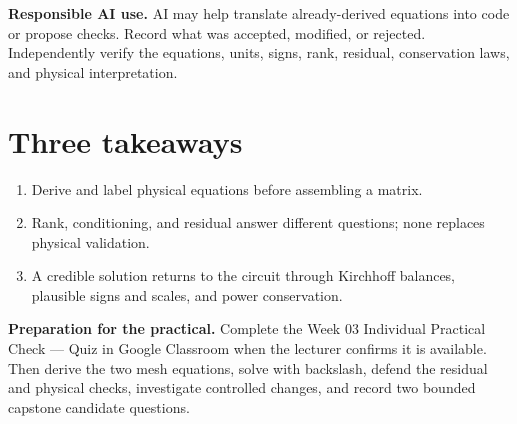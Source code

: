 \documentclass[11pt,a4paper]{article}
\begin{document}
\begin{aibox}
\textbf{Responsible AI use.} AI may help translate already-derived equations into code or propose checks. Record what was accepted, modified, or rejected. Independently verify the equations, units, signs, rank, residual, conservation laws, and physical interpretation.
\end{aibox}

\section*{Three takeaways}
\begin{enumerate}[nosep,leftmargin=6mm]
  \item Derive and label physical equations before assembling a matrix.
  \item Rank, conditioning, and residual answer different questions; none replaces physical validation.
  \item A credible solution returns to the circuit through Kirchhoff balances, plausible signs and scales, and power conservation.
\end{enumerate}

\begin{keybox}
\textbf{Preparation for the practical.} Complete the Week 03 Individual Practical Check --- Quiz in Google Classroom when the lecturer confirms it is available. Then derive the two mesh equations, solve with backslash, defend the residual and physical checks, investigate controlled changes, and record two bounded capstone candidate questions.
\end{keybox}
\end{document}

